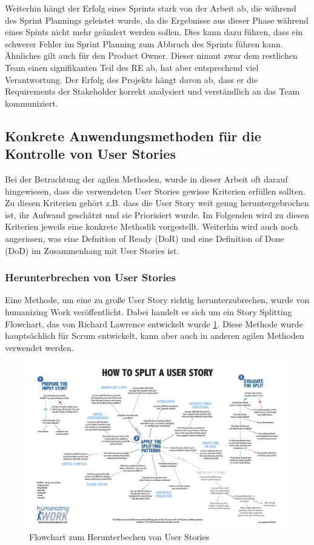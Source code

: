 \documentclass[acmtog]{acmart}
\begin{document}
Weiterhin hängt der Erfolg eines Sprints stark von der Arbeit ab, die während des Sprint Plannings geleistet wurde, da die Ergebnisse aus 
dieser Phase während eines Spints nicht mehr geändert werden sollen. Dies kann dazu führen, dass ein schwerer Fehler im Sprint Planning zum 
Abbruch des Sprints führen kann. Ähnliches gilt auch für den Product Owner. Dieser nimmt zwar dem restlichen Team einen signifikanten Teil 
des RE ab, hat aber entsprechend viel Verantwortung. Der Erfolg des Projekts hängt davon ab, dass er die Requirements der Stakeholder korrekt 
analysiert und verständlich an das Team kommuniziert.

\subsection{Konkrete Anwendungsmethoden für die Kontrolle von User Stories}

Bei der Betrachtung der agilen Methoden, wurde in dieser Arbeit oft darauf hingewiesen, dass die verwendeten User Stories gewisse Kriterien 
erfüllen sollten. Zu diesen Kriterien gehört z.B. dass die User Story weit genug heruntergebrochen ist, ihr Aufwand geschätzt und sie Priorisiert 
wurde. Im Folgenden wird zu diesen Kriterien jeweils eine konkrete Methodik vorgestellt. Weiterhin wird auch noch angerissen, was eine Defnition of 
Ready (DoR) und eine Definition of Done (DoD) im Zusammenhang mit User Stories ist.

\subsubsection{Herunterbrechen von User Stories} \label{sec:breakedown}

Eine Methode, um eine zu große User Story richtig herunterzubrechen, wurde von humanizing Work veröffentlicht. Dabei handelt es sich um ein Story 
Splitting Flowchart, das von Richard Lawrence entwickelt wurde \ref{fig:breakedownt}. Diese Methode wurde hauptsächlich für Scrum entwickelt, kann aber auch 
in anderen agilen Methoden verwendet werden. \cite{humanizingwork}

\begin{figure}[t]
  \centering
  \includegraphics[width=\linewidth]{images/HW-Story-Splitting-Flowchart-Thumbnail.jpg}
  \caption{Flowchart zum Herunterbechen von User Stories \cite{humanizingwork}}
    \label{fig:breakedownt}
  \Description{}
\end{figure}
\end{document}
